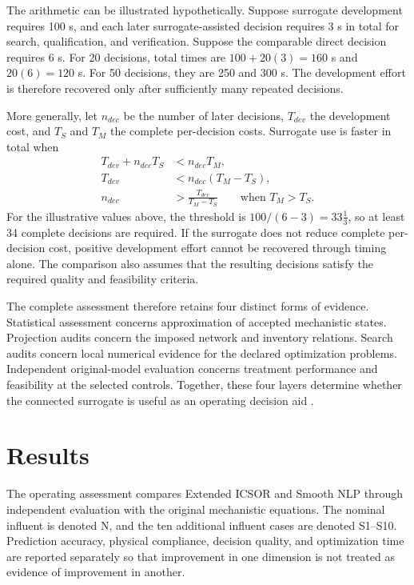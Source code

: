 The arithmetic can be illustrated hypothetically. Suppose surrogate development requires 100 s, and each later surrogate-assisted decision requires 3 s in total for search, qualification, and verification. Suppose the comparable direct decision requires 6 s. For 20 decisions, total times are $100+20(3)=160$ s and $20(6)=120$ s. For 50 decisions, they are 250 and 300 s. The development effort is therefore recovered only after sufficiently many repeated decisions.

More generally, let $n_{dec}$ be the number of later decisions, $T_{dev}$ the development cost, and $T_S$ and $T_M$ the complete per-decision costs. Surrogate use is faster in total when
\[
\begin{aligned}
T_{dev}+n_{dec}T_S&<n_{dec}T_M,\\
T_{dev}&<n_{dec}(T_M-T_S),\\
n_{dec}&>\frac{T_{dev}}{T_M-T_S}\qquad\text{when }T_M>T_S.
\end{aligned}
\]
For the illustrative values above, the threshold is $100/(6-3)=33\tfrac13$, so at least 34 complete decisions are required. If the surrogate does not reduce complete per-decision cost, positive development effort cannot be recovered through timing alone. The comparison also assumes that the resulting decisions satisfy the required quality and feasibility criteria.

The complete assessment therefore retains four distinct forms of evidence. Statistical assessment concerns approximation of accepted mechanistic states. Projection audits concern the imposed network and inventory relations. Search audits concern local numerical evidence for the declared optimization problems. Independent original-model evaluation concerns treatment performance and feasibility at the selected controls. Together, these four layers determine whether the connected surrogate is useful as an operating decision aid \citep{BhosekarIerapetritou2018,Pedrozo2025}.

\section{Results}
\label{sec:plant_results}

The operating assessment compares Extended ICSOR and Smooth NLP through independent evaluation with the original mechanistic equations. The nominal influent is denoted N, and the ten additional influent cases are denoted S1--S10. Prediction accuracy, physical compliance, decision quality, and optimization time are reported separately so that improvement in one dimension is not treated as evidence of improvement in another.

